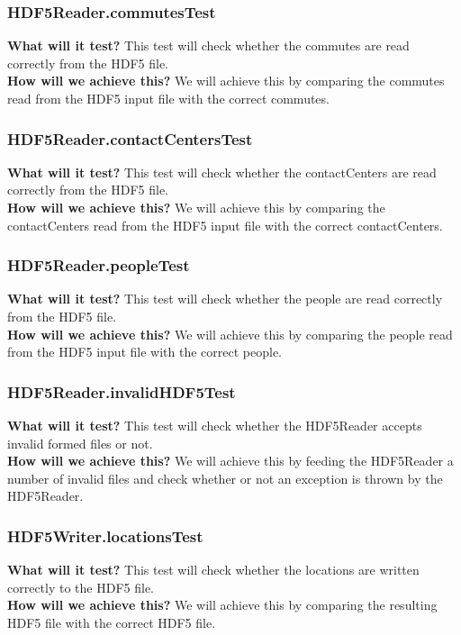 \documentclass{article}
\begin{document}
\subsubsection{HDF5Reader.commutesTest}
\textbf{What will it test?}
This test will check whether the commutes are read correctly from the HDF5 file. \\
\newline
\textbf{How will we achieve this?}
We will achieve this by comparing the commutes read from the HDF5 input file with the correct commutes.

\subsubsection{HDF5Reader.contactCentersTest}
\textbf{What will it test?}
This test will check whether the contactCenters are read correctly from the HDF5 file. \\
\newline
\textbf{How will we achieve this?}
We will achieve this by comparing the contactCenters read from the HDF5 input file with the correct contactCenters.

\subsubsection{HDF5Reader.peopleTest}
\textbf{What will it test?}
This test will check whether the people are read correctly from the HDF5 file. \\
\newline
\textbf{How will we achieve this?}
We will achieve this by comparing the people read from the HDF5 input file with the correct people.

\subsubsection{HDF5Reader.invalidHDF5Test}
\textbf{What will it test?}
This test will check whether the HDF5Reader accepts invalid formed files or not. \\
\newline
\textbf{How will we achieve this?}
We will achieve this by feeding the HDF5Reader a number of invalid files and check whether or not an exception is thrown by the HDF5Reader.

\subsubsection{HDF5Writer.locationsTest}
\textbf{What will it test?}
This test will check whether the locations are written correctly to the HDF5 file. \\
\newline
\textbf{How will we achieve this?}
We will achieve this by comparing the resulting HDF5 file with the correct HDF5 file.
\end{document}
